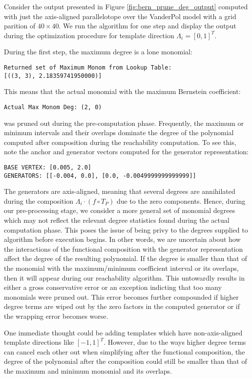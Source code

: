 Consider the output presented in Figure \ref{fig:bern_prune_deg_output} computed with just the axis-aligned parallelotope over the VanderPol model with a grid parition of $40 \times 40$. We run the algorithm for one step and display the output during the optimization procedure for template direction $\Lambda_i = [0,1]^T$.

During the first step, the maximum degree is a lone monomial:
%
\begin{verbatim}
Returned set of Maximum Monom from Lookup Table:
[((3, 3), 2.18359741950000)]
\end{verbatim}
%
This means that the actual monomial with the maximum Bernstein coefficient:
\begin{verbatim}
Actual Max Monom Deg: (2, 0)
\end{verbatim}
%
was pruned out during the pre-computation phase.
%
Frequently, the maximum or minimum intervals and their overlaps dominate the degree of the polynomial computed after composition during the reachability computation. To see this, note the anchor and generator vectors computed for the generator representation:
%
\begin{verbatim}
BASE VERTEX: [0.005, 2.0]
GENERATORS: [[-0.004, 0.0], [0.0, -0.0049999999999999]]
\end{verbatim}

The generators are axis-aligned, meaning that several degrees are annihilated during the composition $\Lambda_i\cdot (f\circ T_P)$ due to the zero components.
%
Hence, during our pre-processing stage, we consider a more general set of monomial degrees which may not reflect the relevant degree statistics found during the actual computation phase.
%
This poses the issue of being privy to the degrees supplied to algorithm before execution begins.
%
In other words, we are uncertain about how the interactions of the functional composition with the generator representation affect the degree of the resulting polynomial. If the degree is smaller than that of the monomial with the maximum/minimum coefficient interval or its overlaps, then it will appear during our reachability algorithm. This untowardly results in either a gross conservative error or an exception indicting that too many monomials were pruned out.
%
This error becomes further compounded if higher degree terms are wiped out by the zero factors in the computed generator or if the wrapping error becomes worse.

One immediate thought could be adding templates which have non-axis-aligned template directions like $[-1,1]^T$. However, due to the ways higher degree terms can cancel each other out when simplifying after the functional composition, the degree of the polynomial after the composition could still be smaller than that of the maximum and minimum monomial and its overlaps.

